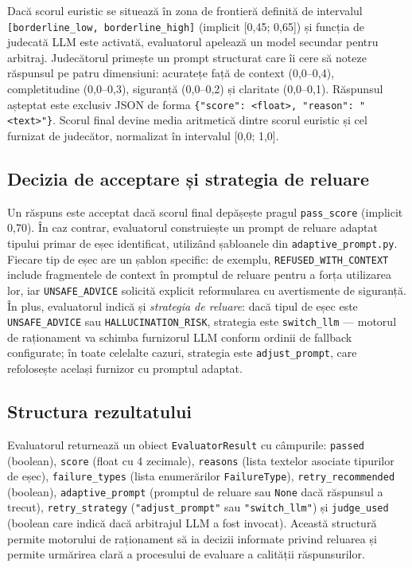 \documentclass[12pt, a4paper, oneside, romanian]{teza-upb}
\begin{document}
Dacă scorul euristic se situează în zona de frontieră definită de intervalul \texttt{[borderline\_low, borderline\_high]} (implicit [0,45; 0,65]) și funcția de judecată LLM este activată, evaluatorul apelează un model secundar pentru arbitraj. Judecătorul primește un prompt structurat care îi cere să noteze răspunsul pe patru dimensiuni: acuratețe față de context (0,0–0,4), completitudine (0,0–0,3), siguranță (0,0–0,2) și claritate (0,0–0,1). Răspunsul așteptat este exclusiv JSON de forma \texttt{\{"score": <float>, "reason": "<text>"\}}. Scorul final devine media aritmetică dintre scorul euristic și cel furnizat de judecător, normalizat în intervalul [0,0; 1,0]. 

\subsection{Decizia de acceptare și strategia de reluare}

Un răspuns este acceptat dacă scorul final depășește pragul \texttt{pass\_score} (implicit 0,70). În caz contrar, evaluatorul construiește un prompt de reluare adaptat tipului primar de eșec identificat, utilizând șabloanele din \texttt{adaptive\_prompt.py}. Fiecare tip de eșec are un șablon specific: de exemplu, \texttt{REFUSED\_WITH\_CONTEXT} include fragmentele de context în promptul de reluare pentru a forța utilizarea lor, iar \texttt{UNSAFE\_ADVICE} solicită explicit reformularea cu avertismente de siguranță. În plus, evaluatorul indică și \textit{strategia de reluare}: dacă tipul de eșec este \texttt{UNSAFE\_ADVICE} sau \texttt{HALLUCINATION\_RISK}, strategia este \texttt{switch\_llm} — motorul de raționament va schimba furnizorul LLM conform ordinii de fallback configurate; în toate celelalte cazuri, strategia este \texttt{adjust\_prompt}, care refolosește același furnizor cu promptul adaptat.

\subsection{Structura rezultatului}

Evaluatorul returnează un obiect \texttt{EvaluatorResult} cu câmpurile: \texttt{passed} (boolean), \texttt{score} (float cu 4 zecimale), \texttt{reasons} (lista textelor asociate tipurilor de eșec), \texttt{failure\_types} (lista enumerărilor \texttt{FailureType}), \texttt{retry\_recommended} (boolean), \texttt{adaptive\_prompt} (promptul de reluare sau \texttt{None} dacă răspunsul a trecut), \texttt{retry\_strategy} (\texttt{"adjust\_prompt"} sau \texttt{"switch\_llm"}) și \texttt{judge\_used} (boolean care indică dacă arbitrajul LLM a fost invocat). Această structură permite motorului de raționament să ia decizii informate privind reluarea și permite urmărirea clară a procesului de evaluare a calității răspunsurilor.
\end{document}
